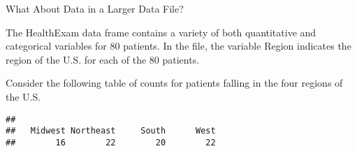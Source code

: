 \documentclass[12pt,ignorenonframetext,aspectratio=169]{beamer}
\newenvironment{Shaded}{\begin{snugshade}}{\end{snugshade}}
\newcommand{\KeywordTok}[1]{\textcolor[rgb]{0.13,0.29,0.53}{\textbf{{#1}}}}
\newcommand{\StringTok}[1]{\textcolor[rgb]{0.31,0.60,0.02}{{#1}}}
\newcommand{\NormalTok}[1]{{#1}}
\begin{document}
\begin{frame}[fragile]{What About Data in a Larger Data File?}

The HealthExam data frame contains a variety of both quantitative and
categorical variables for 80 patients. In the file, the variable Region
indicates the region of the U.S. for each of the 80 patients.

Consider the following table of counts for patients falling in the four
regions of the U.S.

\begin{Shaded}
\end{Shaded}

\begin{verbatim}
## 
##   Midwest Northeast     South      West 
##        16        22        20        22
\end{verbatim}


\end{frame}
\end{document}
